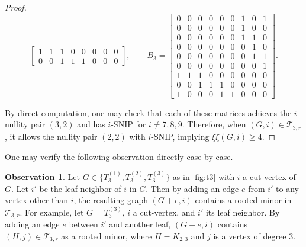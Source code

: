 \documentclass{article}
\theoremstyle{definition}
\newtheorem{observation}[theorem]{Observation}
\newcommand{\excise}{\xi\xi}
\newcommand{\ttfr}{\mathcal{T}_{3,r}}
\begin{document}
\begin{proof}
\[\begin{bmatrix}
        1 & 1 & 1 & 0 & 0 & 0 & 0 & 0 \\
        0 & 0 & 1 & 1 & 1 & 0 & 0 & 0
    \end{bmatrix}, \qquad
    B_3 = \begin{bmatrix}
        0 & 0 & 0 & 0 & 0 & 0 & 1 & 0 & 1 \\
        0 & 0 & 0 & 0 & 0 & 0 & 1 & 0 & 0 \\
        0 & 0 & 0 & 0 & 0 & 0 & 1 & 1 & 0 \\
        0 & 0 & 0 & 0 & 0 & 0 & 0 & 1 & 0 \\
        0 & 0 & 0 & 0 & 0 & 0 & 0 & 1 & 1 \\
        0 & 0 & 0 & 0 & 0 & 0 & 0 & 0 & 1 \\
        1 & 1 & 1 & 0 & 0 & 0 & 0 & 0 & 0 \\
        0 & 0 & 1 & 1 & 1 & 0 & 0 & 0 & 0 \\
        1 & 0 & 0 & 0 & 1 & 1 & 0 & 0 & 0
    \end{bmatrix}.
\]

By direct computation, one may check that each of these matrices achieves the $i$-nullity pair $(3,2)$ and has $i$-SNIP for $i\neq 7,8,9$.  Therefore, when $(G,i)\in\ttfr$, it allows the nullity pair $(2,2)$ with $i$-SNIP, implying $\excise(G,i) \geq 4$.   
\end{proof}

One may verify the following observation directly case by case.

\begin{observation}
\label{obs:addedge}
Let $G\in\{T_3^{(1)}, T_3^{(2)}, T_3^{(3)}\}$ as in \cref{fig:t3} with $i$ a cut-vertex of $G$.  Let $i'$ be the leaf neighbor of $i$ in $G$.  Then by adding an edge $e$ from $i'$ to any vertex other than $i$, the resulting graph $(G+e,i)$ contains a rooted minor in $\ttfr$.  For example, let $G = T_3^{(3)}$, $i$ a cut-vertex, and $i'$ its leaf neighbor.  By adding an edge $e$ between $i'$ and another leaf, $(G+e,i)$ contains $(H,j)\in\ttfr$ as a rooted minor, where $H = K_{2,3}$ and $j$ is a vertex of degree $3$.
\end{observation}
\end{document}
